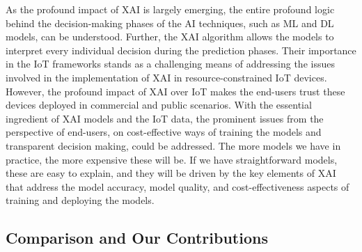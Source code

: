 \documentclass[journal]{IEEEtran}
\begin{document}
As the profound impact of XAI is largely emerging, the entire profound logic behind the decision-making phases of the AI techniques, such as ML and DL models, can be understood. Further, the XAI algorithm allows the models to interpret every individual decision during the prediction phases. Their importance in the IoT frameworks stands as a challenging means of addressing the issues involved in the implementation of XAI in resource-constrained IoT devices. However, the profound impact of XAI over IoT makes the end-users trust these devices deployed in commercial and public scenarios. With the essential ingredient of XAI models and the IoT data, the prominent issues from the perspective of end-users, on cost-effective ways of training the models and transparent decision making, could be addressed. The more models we have in practice, the more expensive these will be. If we have straightforward models, these are easy to explain, and they will be driven by the key elements of XAI that address the model accuracy, model quality, and cost-effectiveness aspects of training and deploying the models.

\subsection{Comparison and Our Contributions}
\end{document}
